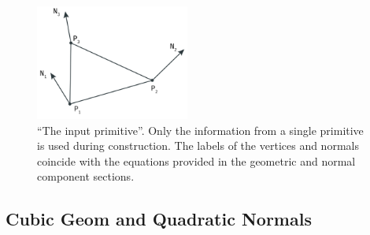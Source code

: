 \begin{figure}
	\centering
	\includegraphics[width=0.45\textwidth]{./content/img/method/input.png}
	\caption{``The input primitive''. Only the information from a single primitive is used during construction. The labels of the vertices and normals coincide with the equations provided in the geometric and normal component sections. }
	\label{fig:method:input_primitive}
\end{figure}





\subsection{Cubic Geom and Quadratic Normals} \label{ss:method:cubic_geometry_and_quadratic_normals}
%
%